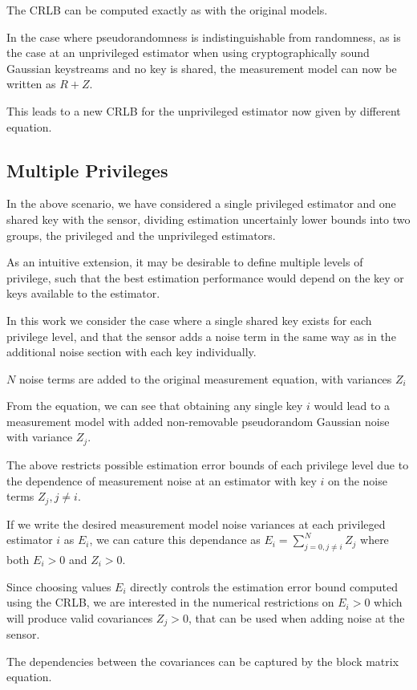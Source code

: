 \documentclass[conference]{IEEEtran}
\theoremstyle{definition}
\theoremstyle{definition}
\theoremstyle{remark}
\begin{document}
The CRLB can be computed exactly as with the original models.

In the case where pseudorandomness is indistinguishable from randomness, as is the case at an unprivileged estimator when using cryptographically sound Gaussian keystreams and no key is shared, the measurement model can now be written as $R+Z$.

This leads to a new CRLB for the unprivileged estimator now given by different equation.

\subsection{Multiple Privileges}
In the above scenario, we have considered a single privileged estimator and one shared key with the sensor, dividing estimation uncertainly lower bounds into two groups, the privileged and the unprivileged estimators.

As an intuitive extension, it may be desirable to define multiple levels of privilege, such that the best estimation performance would depend on the key or keys available to the estimator.

In this work we consider the case where a single shared key exists for each privilege level, and that the sensor adds a noise term in the same way as in the additional noise section with each key individually.

$N$ noise terms are added to the original measurement equation, with variances $Z_i$

From the equation, we can see that obtaining any single key $i$ would lead to a measurement model with added non-removable pseudorandom Gaussian noise with variance $Z_j$.

The above restricts possible estimation error bounds of each privilege level due to the dependence of measurement noise at an estimator with key $i$ on the noise terms $Z_j,j\neq i$.

If we write the desired measurement model noise variances at each privileged estimator $i$ as $E_i$, we can cature this dependance as $E_i=\sum^N_{j=0,j\neq i}Z_j$ where both $E_i>0$ and $Z_i>0$.

Since choosing values $E_i$ directly controls the estimation error bound computed using the CRLB, we are interested in the numerical restrictions on $E_i>0$ which will produce valid covariances $Z_j>0$, that can be used when adding noise at the sensor.

The dependencies between the covariances can be captured by the block matrix equation.
\end{document}
